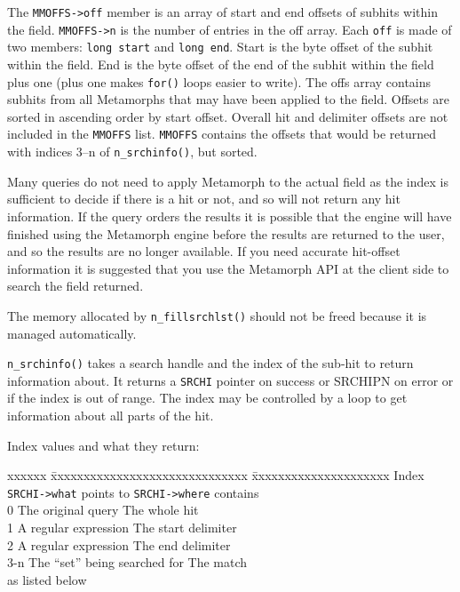 The \verb`MMOFFS->off` member is an array of start and end offsets of
subhits within the field. \verb`MMOFFS->n` is the number of entries
in the off array. Each \verb`off` is made of two members: \verb`long start`
and \verb`long end`. Start is the byte offset of the subhit within
the field. End is the byte offset of the end of the subhit within
the field plus one (plus one makes \verb`for()` loops easier to write).
The offs array contains subhits from all Metamorphs that may have been
applied to the field. Offsets are sorted in ascending order by start offset.
Overall hit and delimiter offsets are not included in the \verb`MMOFFS` list.
\verb`MMOFFS` contains the offsets that would be returned with
indices 3--n of \verb`n_srchinfo()`, but sorted.

Many queries do not need to apply Metamorph to the actual field as the index
is sufficient to decide if there is a hit or not, and so will not return any
hit information.  If the query orders the results it is possible that the
engine will have finished using the Metamorph engine before the results
are returned to the user, and so the results are no longer available.  If
you need accurate hit-offset information it is suggested that you use the
Metamorph API at the client side to search the field returned.

The memory allocated by \verb`n_fillsrchlst()` should not be freed
because it is managed automatically.

\verb`n_srchinfo()` takes a search handle and the index of the sub-hit
to return information about.  It returns a \verb`SRCHI` pointer on
success or SRCHIPN on error or if the index is out of range.  The index
may be controlled by a loop to get information about all parts of the
hit.

Index values and what they return:
\begin{tabbing}
xxxxxx \= xxxxxxxxxxxxxxxxxxxxxxxxxxxxxx \= xxxxxxxxxxxxxxxxxxxxx \kill
Index  \> \verb`SRCHI->what` points to   \> \verb`SRCHI->where` contains \\
0      \> The original query             \> The whole hit         \\
1      \> A regular expression           \> The start delimiter   \\
2      \> A regular expression           \> The end delimiter     \\
3-n    \> The ``set'' being searched for \> The match             \\
       \> as listed below                \>                       \\
\end{tabbing}

